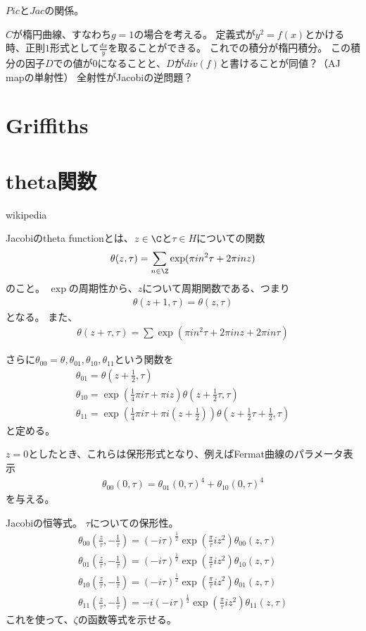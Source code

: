 \documentclass{jsarticle}
\begin{document}
$Pic$と$Jac$の関係。

$C$が楕円曲線、すなわち$g=1$の場合を考える。
定義式が$y^2=f(x)$とかける時、正則$1$形式として$\frac{dx}{y}$を取ることができる。
これでの積分が楕円積分。
この積分の因子$D$での値が$0$になることと、$D$が$div(f)$と書けることが同値？（AJ mapの単射性）
全射性がJacobiの逆問題？

\section{Griffiths}

\section{theta関数}
wikipedia

Jacobiのtheta functionとは、$z\in\C$と$\tau\in H$についての関数
\begin{align*}
\theta(z,\tau)=\sum_{n\in\Z}\exp(\pi in^2\tau+2\pi inz)
\end{align*}
のこと。
$\exp$の周期性から、$z$について周期関数である、つまり
\begin{align*}
\theta(z+1,\tau)=\theta(z,\tau)
\end{align*}
となる。
また、
\begin{align*}
\theta(z+\tau,\tau)=\sum\exp(\pi in^2\tau+2\pi inz+2\pi in\tau)
\end{align*}

さらに$\theta_{00}=\theta, \theta_{01}, \theta_{10}, \theta_{11}$という関数を
\begin{align*}
\theta_{01}=\theta(z+\frac{1}{2},\tau)\\
\theta_{10}=\exp(\frac{1}{4}\pi i \tau+\pi i z)\theta(z+\frac{1}{2}\tau, \tau)\\
\theta_{11}=\exp(\frac{1}{4}\pi i \tau+\pi i(z+\frac{1}{2}))\theta(z+\frac{1}{2}\tau+\frac{1}{2},\tau)
\end{align*}
と定める。

$z=0$としたとき、これらは保形形式となり、例えばFermat曲線のパラメータ表示
\begin{align*}
\theta_{00}(0,\tau)=\theta_{01}(0,\tau)^4+\theta_{10}(0,\tau)^4
\end{align*}
を与える。

Jacobiの恒等式。
$\tau$についての保形性。
\begin{align*}
\theta_{00}(\frac{z}{\tau},-\frac{1}{\tau})=(-i\tau)^{\frac{1}{2}}\exp(\frac{\pi}{\tau}iz^2)\theta_{00}(z,\tau)\\
\theta_{01}(\frac{z}{\tau},-\frac{1}{\tau})=(-i\tau)^{\frac{1}{2}}\exp(\frac{\pi}{\tau}iz^2)\theta_{10}(z,\tau)\\
\theta_{10}(\frac{z}{\tau},-\frac{1}{\tau})=(-i\tau)^{\frac{1}{2}}\exp(\frac{\pi}{\tau}iz^2)\theta_{01}(z,\tau)\\
\theta_{11}(\frac{z}{\tau},-\frac{1}{\tau})=-i(-i\tau)^{\frac{1}{2}}\exp(\frac{\pi}{\tau}iz^2)\theta_{11}(z,\tau)
\end{align*}
これを使って、$\zeta$の函数等式を示せる。
\end{document}
